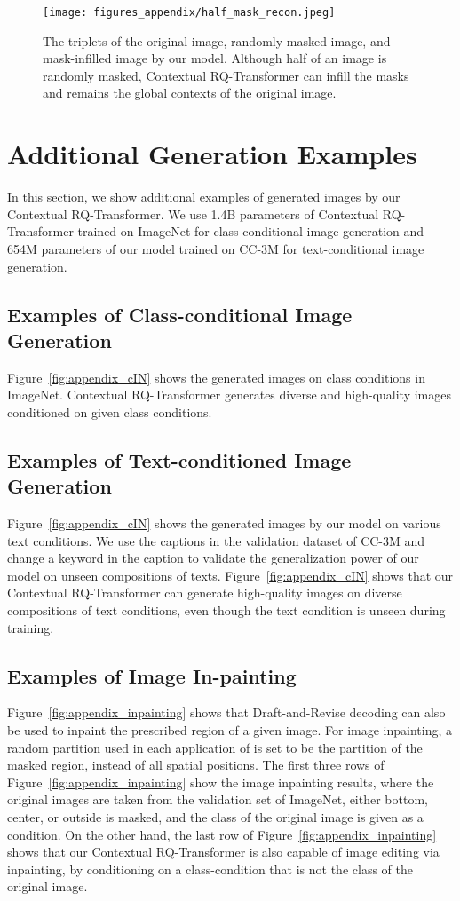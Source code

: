 \documentclass{article}
\begin{document}
\begin{figure}
\centering
\texttt{[image: figures\_appendix/half\_mask\_recon.jpeg]}
\caption{The triplets of the original image, randomly masked image, and mask-infilled image by our model. Although half of an image is randomly masked, Contextual RQ-Transformer can infill the masks and remains the global contexts of the original image.}
\label{fig:appendix_half_mask_recon}
\end{figure}


\section{Additional Generation Examples}
In this section, we show additional examples of generated images by our Contextual RQ-Transformer.
We use 1.4B parameters of Contextual RQ-Transformer trained on ImageNet for class-conditional image generation and 654M parameters of our model trained on CC-3M for text-conditional image generation. 

\subsection{Examples of Class-conditional Image Generation}
Figure~\ref{fig:appendix_cIN} shows the generated images on class conditions in ImageNet.
Contextual RQ-Transformer generates diverse and high-quality images conditioned on given class conditions.

\subsection{Examples of Text-conditioned Image Generation}
Figure~\ref{fig:appendix_cIN} shows the generated images by our model on various text conditions.
We use the captions in the validation dataset of CC-3M and change a keyword in the caption to validate the generalization power of our model on unseen compositions of texts.
Figure~\ref{fig:appendix_cIN} shows that our Contextual RQ-Transformer can generate high-quality images on diverse compositions of text conditions, even though the text condition is unseen during training.

\subsection{Examples of Image In-painting}
Figure~\ref{fig:appendix_inpainting} shows that Draft-and-Revise decoding can also be used to inpaint the prescribed region of a given image.
For image inpainting, a random partition  used in each application of  is set to be the partition of the masked region, instead of all spatial positions.
The first three rows of Figure~\ref{fig:appendix_inpainting} show the image inpainting results, where the original images are taken from the validation set of ImageNet, either bottom, center, or outside is masked, and the class of the original image is given as a condition. 
On the other hand, the last row of Figure~\ref{fig:appendix_inpainting} shows that our Contextual RQ-Transformer is also capable of image editing via inpainting, by conditioning on a class-condition that is not the class of the original image. 
\end{document}
